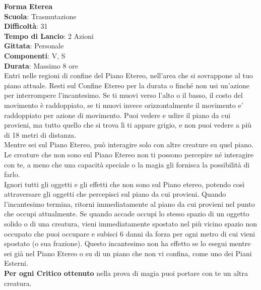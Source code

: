 \begin{multicols}{2}
\medskip\textbf{Forma Eterea}\\
\textbf{Scuola}: Trasmutazione\\
\textbf{Difficoltà}: 31\\
\textbf{Tempo di Lancio}: 2 Azioni\\
\textbf{Gittata}: Personale\\
\textbf{Componenti}: V, S\\
\textbf{Durata}: Massimo 8 ore\\
Entri nelle regioni di confine del Piano Etereo, nell'area che si sovrappone al tuo piano attuale. Resti sul Confine Etereo per la durata o finché non usi un'azione per interrompere l'incantesimo. Se ti muovi verso l'alto o il basso, il costo del movimento è raddoppiato, se ti muovi invece orizzontalmente il movimento e' raddoppiato per azione di movimento. Puoi vedere e udire il piano da cui provieni, ma tutto quello che si trova lì ti appare grigio, e non puoi vedere a più di 18 metri di distanza.\\
Mentre sei sul Piano Etereo, può interagire solo con altre creature su quel piano. Le creature che non sono sul Piano Etereo non ti possono percepire né interagire con te, a meno che una capacità speciale o la magia gli fornisca la possibilità di farlo.\\
Ignori tutti gli oggetti e gli effetti che non sono sul Piano etereo, potendo così attraversare gli oggetti che percepisci sul piano da cui provieni. Quando l'incantesimo termina, ritorni immediatamente al piano da cui provieni nel punto che occupi attualmente. Se quando accade occupi lo stesso spazio di un oggetto solido o di una creatura, vieni immediatamente spostato nel più vicino spazio non occupato che puoi occupare e subisci 6 danni da forza per ogni metro di cui vieni spostato (o sua frazione). Questo incantesimo non ha effetto se lo esegui mentre sei già nel Piano Etereo o su di un piano che non vi confina, come uno dei Piani Esterni.\\
\textbf{Per ogni Critico ottenuto} nella prova di magia puoi portare con te un altra creatura.


\end{multicols}
